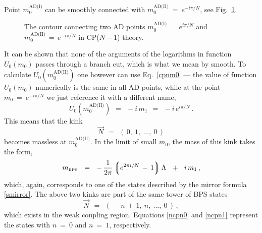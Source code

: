 \documentclass[epsfig,12pt]{article}
\def\beq{\begin{equation}}
\def\eeq{\end{equation}}
\def\beq{\begin{equation}}
\def\eeq{\end{equation}}
\newcommand{\lgr}{\left\lgroup}
\newcommand{\rgr}{\right\rgroup}
\newcommand{\mbps}{m_{\text{\tiny BPS}}}
\begin{document}
	Point $ m_0^\text{AD(I)} $ can be smoothly connected with $ m_0^\text{AD(II)} ~=~ e^{ - i \pi / N } $,
	see Fig.~\ref{cpn}.
\begin{figure}
\begin{center}
\epsfxsize=8.0cm
\caption{The contour connecting two AD points $ m_0^\text{AD(I)} \,=\, e^{ i \pi / N } $ and $ m_0^\text{AD(II)} \,=\, e^{ - i \pi / N } $
in CP($N-1$) theory.}
\label{cpn}
\end{center}
\end{figure}
	It can be shown that none of the arguments of the logarithms in function $ U_0(m_0) $ passes through
	a branch cut, which is what we mean by smooth.
	To calculate $ U_0(m_0^\text{AD(II)}) $ one however can use Eq.~\eqref{cpnm0} --- 
	the value of function $ U_0(m_0) $ numerically is the same in all AD points, 
	while at the point $ m_0 ~=~ e^{ - i \pi / N } $ we just reference it with a different name,
\beq
\label{cpnm1}
	U_0(m_0^\text{AD(II)}) ~~=~~ -i\, m_1 ~~=~~ -i\, e^{i \pi / N}\,.
\eeq
	This means that the kink 
\beq
\label{ncpn1}
	\vec{N} ~~=~~ (\, 0,~ 1,~ ...,~ 0 \,)
\eeq
	becomes massless at $ m_0^\text{AD(II)} $.
	In the limit of small $ m_0 $, the mass of this kink takes the form,
\beq
	\mbps ~~=~~ -\, \frac{1}{2\pi} \lgr e^{2\pi i / N} \,-\, 1 \rgr \Lambda ~~+~~ i\, m_1\,,
\eeq
	which, again, corresponds to one of the states described by the mirror formula \eqref{smirror}.
	The above two kinks are part of the same tower of BPS states
\beq
\label{tow1}
	\vec{N} ~~=~~ (\, -n \,+\, 1,~ n,~ ...,~ 0 \,)\,,
\eeq
	which exists in the weak coupling region.
	Equations \eqref{ncpn0} and \eqref{ncpn1} represent the states with $ n ~=~ 0 $ and $ n ~=~ 1 $,
	respectively.
\end{document}
